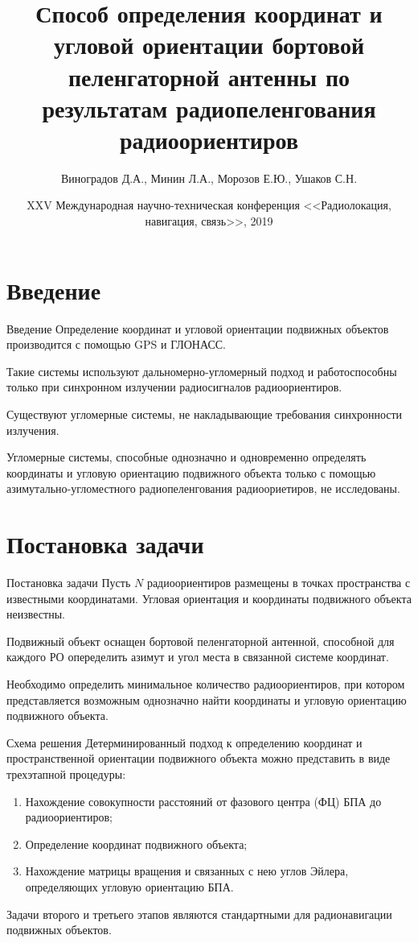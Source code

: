 \documentclass[russian,hyperref={unicode}]{beamer}
\title{Способ определения координат и угловой ориентации бортовой пеленгаторной антенны по результатам радиопеленгования радиоориентиров}
\institute
{
  \inst{1}%
  Военно-воздушная академия имени профессора Н.Е.Жуковского и Ю.А.Гагарина\\
  \inst{2}%
	Воронежский Государственный Университет
}
\author
{
  Виноградов Д.А.\inst{1}, Минин Л.А.\inst{2}, Морозов Е.Ю.\inst{2}, Ушаков С.Н\inst{2}.
}
\date[RLNC 2019]{XXV Международная научно-техническая конференция <<Радиолокация, навигация, связь>>, 2019}
\begin{document}
  \frame{\titlepage}

  \section{Введение}
  \begin{frame}{Введение}
    Определение координат и угловой ориентации подвижных объектов производится с
    помощью GPS и ГЛОНАСС.

    Такие системы используют дальномерно-угломерный подход и работоспособны только
    при синхронном излучении радиосигналов радиоориентиров.

    Существуют угломерные системы, не накладывающие требования синхронности излучения.

    Угломерные системы, способные однозначно и одновременно определять координаты и
    угловую ориентацию подвижного объекта только с помощью азимутально-угломестного радиопеленгования
    радиоориетиров, не исследованы.
  \end{frame}

  \section{Постановка задачи}
  \begin{frame}{Постановка задачи}
    Пусть $N$ радиоориентиров размещены в точках пространства с известными координатами. Угловая ориентация
    и координаты подвижного объекта неизвестны.

    Подвижный объект оснащен бортовой пеленгаторной антенной, способной для каждого РО опеределить азимут и
    угол места в связанной системе координат.

    Необходимо определить минимальное количество радиоориентиров, при котором
    представляется возможным однозначно найти координаты и угловую ориентацию
    подвижного объекта.
  \end{frame}
  \begin{frame}{Схема решения}
    Детерминированный подход к определению координат и пространственной ориентации подвижного объекта можно представить
    в виде трехэтапной процедуры:
    \begin{enumerate}
        \item Нахождение совокупности расстояний от фазового центра (ФЦ) БПА до радиоориентиров;
        \item Определение координат подвижного объекта;
        \item Нахождение матрицы вращения и связанных с нею углов Эйлера, определяющих угловую ориентацию БПА.
    \end{enumerate}
    Задачи второго и третьего этапов являются стандартными для радионавигации подвижных объектов.
  \end{frame}
\end{document}
